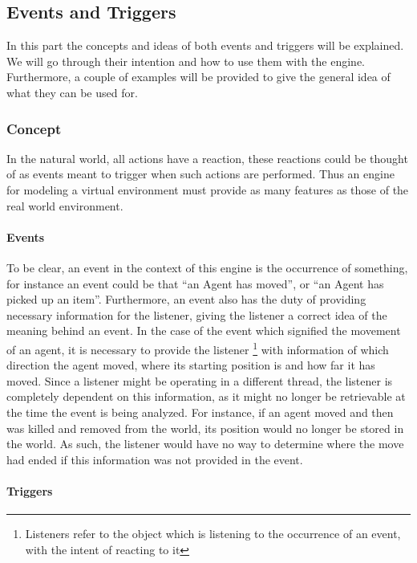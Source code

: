 
\subsection{Events and Triggers}

In this part the concepts and ideas of both events and triggers will
be explained. We will go through their intention and how to use them
with the engine. Furthermore, a couple of examples will be provided
to give the general idea of what they can be used for. 


\subsubsection{Concept}

In the natural world, all actions have a reaction, these reactions
could be thought of as events meant to trigger when such actions are
performed. Thus an engine for modeling a virtual environment must
provide as many features as those of the real world environment.


\paragraph*{Events}

To be clear, an event in the context of this engine is the occurrence
of something, for instance an event could be that \textquotedblleft{}an
Agent has moved\textquotedblright{}, or \textquotedblleft{}an Agent
has picked up an item\textquotedblright{}. Furthermore, an event also
has the duty of providing necessary information for the listener,
giving the listener a correct idea of the meaning behind an event.
In the case of the event which signified the movement of an agent,
it is necessary to provide the listener %
\footnote{Listeners refer to the object which is listening to the occurrence
of an event, with the intent of reacting to it%
} with information of which direction the agent moved, where its starting
position is and how far it has moved. Since a listener might be operating
in a different thread, the listener is completely dependent on this
information, as it might no longer be retrievable at the time the
event is being analyzed. For instance, if an agent moved and then
was killed and removed from the world, its position would no longer
be stored in the world. As such, the listener would have no way to
determine where the move had ended if this information was not provided
in the event.


\paragraph*{Triggers}

